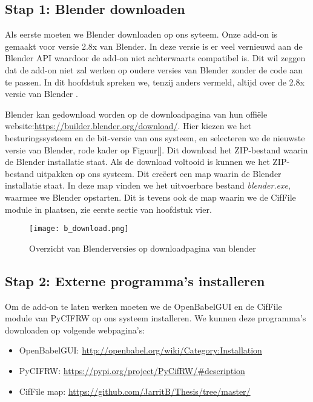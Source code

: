 \subsection{Stap 1: Blender downloaden}
Als eerste moeten we Blender downloaden op ons syteem. Onze add-on is gemaakt voor versie 2.8x van Blender. In deze versie is er veel vernieuwd aan de Blender API waardoor de add-on niet achterwaarts compatibel is. Dit wil zeggen dat de add-on niet zal werken op oudere versies van Blender zonder de code aan te passen. In dit hoofdstuk spreken we, tenzij anders vermeld, altijd over de 2.8x versie van Blender .  
\par
Blender kan gedownload worden op de downloadpagina van hun offiële website:\url{https://builder.blender.org/download/}. Hier kiezen we het besturingssysteem en de bit-versie van ons systeem, en selecteren we de nieuwste versie van Blender, rode kader op Figuur[].  Dit download het ZIP-bestand waarin de Blender installatie staat. Als de download voltooid is kunnen we het ZIP-bestand uitpakken op ons systeem. Dit creëert een map waarin de Blender installatie staat. In deze map vinden we het uitvoerbare bestand \textit{blender.exe}, waarmee we Blender opstarten. Dit is tevens ook de map waarin we de CifFile module in plaatsen, zie eerste sectie van hoofdstuk vier.      

\begin{figure}[h]
\begin{center}
\texttt{[image: b\_download.png]}
\caption{Overzicht van Blenderversies op downloadpagina van blender}
\end{center}
\end{figure}
 
\subsection{Stap 2: Externe programma's installeren}
Om de add-on te laten werken moeten we de OpenBabelGUI en de CifFile module van PyCIFRW op ons systeem installeren. We kunnen deze programma's downloaden op volgende webpagina's:
\begin{itemize}
\item OpenBabelGUI: \url{http://openbabel.org/wiki/Category:Installation}
\item PyCIFRW: \url{https://pypi.org/project/PyCifRW/#description}
\item CifFile map: \url{https://github.com/JarritB/Thesis/tree/master/} 
\end{itemize}   

